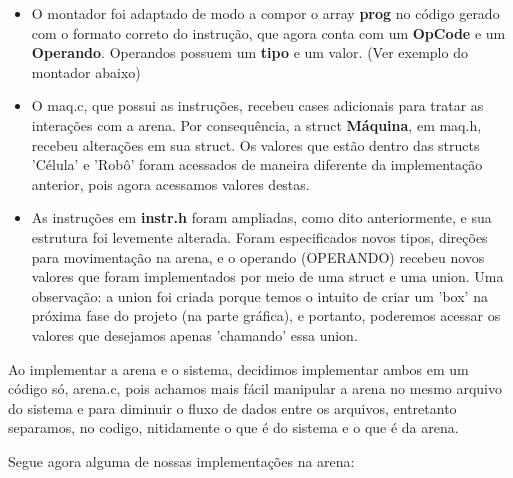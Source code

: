 \documentclass[12pt, a4paper]{article}
\begin{document}
\begin{itemize}

\item O montador foi adaptado de modo a compor o array \textbf{prog} no código gerado com o formato correto do instrução, que agora conta com um \textbf{OpCode} e um \textbf{Operando}. Operandos possuem um \textbf{tipo} e um valor. (Ver exemplo do montador abaixo)
\item O maq.c, que possui as instruções, recebeu cases adicionais para
tratar as interações com a arena. Por consequência, a struct \textbf{Máquina}, em maq.h, recebeu alterações em sua struct. Os valores que estão
dentro das structs 'Célula' e 'Robô' foram acessados de maneira
diferente da implementação anterior, pois agora acessamos valores
destas.
\item As instruções em \textbf{instr.h} foram ampliadas, como dito anteriormente, e sua estrutura foi levemente alterada. Foram especificados
novos tipos, direções para movimentação na arena, e o operando
(OPERANDO) recebeu novos valores que foram implementados por meio
de uma struct e uma union. Uma observação: a union foi criada
porque temos o intuito de criar um 'box' na próxima fase do
projeto (na parte gráfica), e portanto, poderemos acessar os
valores que desejamos apenas 'chamando' essa union.
\end{itemize}
Ao implementar a arena e o sistema, decidimos implementar ambos em um código só, arena.c, pois achamos mais fácil manipular a arena no mesmo arquivo do sistema e para diminuir o fluxo de dados entre os arquivos, entretanto separamos, no codigo, nitidamente o que é do sistema e o que é da arena.\par
Segue agora alguma de nossas implementações na arena:\par
\end{document}
